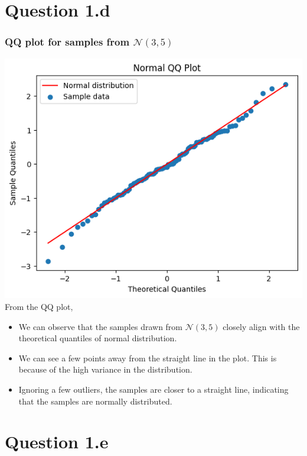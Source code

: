 \documentclass[12pt]{article}
\begin{document}
\newpage
\section*{Question 1.d}
\subsubsection*{QQ plot for samples from \(\mathcal{N}(3, 5)\)}
\includegraphics*[width=\linewidth]{graph1d}
From the QQ plot,
\begin{itemize}
    \item We can observe that the samples drawn from \(\mathcal{N}(3, 5)\)
closely align with the theoretical quantiles of normal distribution.
    \item We can see a few points away from the straight line in the plot.
    This is because of the high variance in the distribution.
    \item Ignoring a few outliers, the samples are closer to a straight line,
    indicating that the samples are normally distributed.
\end{itemize}

\newpage
\section*{Question 1.e}
\end{document}
